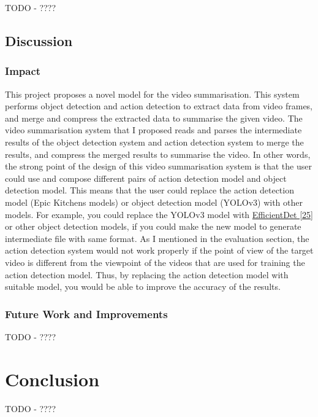 \documentclass{article}
\begin{document}
TODO - ????

\subsection{Discussion}

\subsubsection{Impact}

This project proposes a novel model for the video summarisation. This system performs object detection and action detection to extract data from video frames, and merge and compress the extracted data to summarise the given video. The video summarisation system that I proposed reads and parses the intermediate results of the object detection system and action detection system to merge the results, and compress the merged results to summarise the video. In other words, the strong point of the design of this video summarisation system is that the user could use and compose different pairs of action detection model and object detection model. This means that the user could replace the action detection model (Epic Kitchens models) or object detection model (YOLOv3) with other models. For example, you could replace the YOLOv3 model with \hyperlink{ref8}{EfficientDet [25]} or other object detection models, if you could make the new model to generate intermediate file with same format. As I mentioned in the evaluation section, the action detection system would not work properly if the point of view of the target video is different from the viewpoint of the videos that are used for training the action detection model. Thus, by replacing the action detection model with suitable model, you would be able to improve the accuracy of the results.

\subsubsection{Future Work and Improvements}

TODO - ????

\section{Conclusion}

TODO - ????

\newpage
\end{document}
